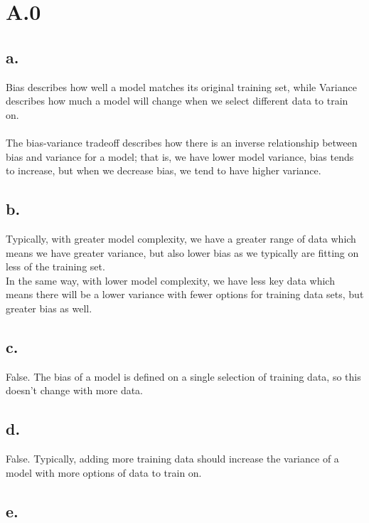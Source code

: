 \documentclass{article}
\date{{}}
\newcommand{\1}{\mathbf{1}}
\begin{document}
\thispagestyle{firstpageheader}

\section*{A.0}
{\Large 

\subsection*{a.}

Bias describes how well a model matches its original training set, while Variance describes how much a model will change when we select different data to train on. \\ \\
The bias-variance tradeoff describes how there is an inverse relationship between bias and variance for a model; that is, we have lower model variance, bias tends to increase, but when we decrease bias, we tend to have higher variance. 

\subsection*{b.}

Typically, with greater model complexity, we have a greater range of data which means we have greater variance, but also lower bias as we typically are fitting on less of the training set. \\
In the same way, with lower model complexity, we have less key data which means there will be a lower variance with fewer options for training data sets, but greater bias as well.

\subsection*{c.}

False. The bias of a model is defined on a single selection of training data, so this doesn't change with more data.

\subsection*{d.}

False. Typically, adding more training data should increase the variance of a model with more options of data to train on.

\subsection*{e.}

}
\end{document}
